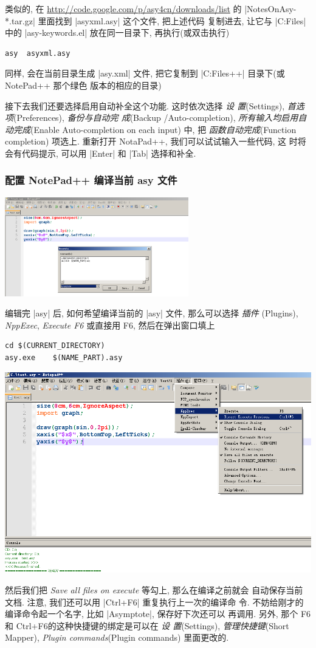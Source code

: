 \documentclass[nofonts,CJKnormalspaces]{ctexbook}[2009/05/20]
\begin{document}
类似的, 在 \url{http://code.google.com/p/asy4cn/downloads/list}
的 |NotesOnAsy-*.tar.gz| 里面找到 |asyxml.asy| 这个文件, 把上述代码
复制进去, 让它与 |C:\Program Files\Asymptote| 中的 |asy-keywords.el|
放在同一目录下, 再执行(或双击执行)
\begin{verbatim}
asy  asyxml.asy
\end{verbatim}
同样, 会在当前目录生成 |asy.xml| 文件, 把它复制到
|C:\Program Files\Notepad++\plugins\APIs| 目录下(或 NotePad++ 那个绿色
版本的相应的目录)

接下去我们还要选择启用自动补全这个功能. 这时依次选择  \emph{设
  置}(Settings), \emph{首选项}(Preferences), \emph{备份与自动完
  成}(Backup /Auto-completion), \emph{所有输入均启用自动完成}(Enable
Auto-completion on each input) 中, 把 \emph{函数自动完成}(Function
completion) 项选上. 重新打开 NotaPad++, 我们可以试试输入一些代码, 这
时将会有代码提示, 可以用 |Enter| 和 |Tab| 选择和补全.

\subsubsection{配置 NotePad++ 编译当前 asy 文件}
\begin{center}
  \includegraphics[width=0.6\textwidth]{NotePad++x.png}
\end{center}
编辑完 |asy| 后, 如何希望编译当前的 |asy| 文件, 那么可以选择
\emph{插件 }(Plugins), \emph{NppExec}, \emph{Execute F6} 或直接用 F6,
然后在弹出窗口填上
\begin{verbatim}
cd $(CURRENT_DIRECTORY)
asy.exe    $(NAME_PART).asy
\end{verbatim}
\begin{center}
  \includegraphics[width=0.6\linewidth]{NotePad++y.png}
\end{center}
然后我们把 \emph{Save all files on execute} 等勾上, 那么在编译之前就会
自动保存当前文档. 注意, 我们还可以用 |Ctrl+F6| 重复执行上一次的编译命
令. 不妨给刚才的编译命令起一个名字, 比如 |Asymptote|, 保存好下次还可以
再调用. 另外, 那个 F6 和 Ctrl+F6的这种快捷键的绑定是可以在 \emph{设
  置}(Settings), \emph{管理快捷键}(Short Mapper), \emph{Plugin
  commands}(Plugin commands) 里面更改的.
\end{document}
